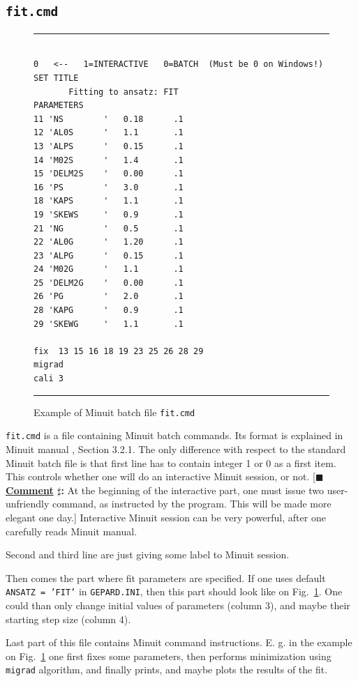 \documentclass[12pt]{article}
\newcounter{comment}
\newcommand{\comminline}[1]{{%
\refstepcounter{comment}%
\ttfamily\small[$\blacksquare$ \textbf{\underline{Comment}
$\sharp$\thecomment:} #1]}}
\begin{document}
\subsection{\texttt{fit.cmd}}

\begin{figure}[t]
\begin{center}
\hrule
\begin{verbatim}

0   <--   1=INTERACTIVE   0=BATCH  (Must be 0 on Windows!)
SET TITLE
       Fitting to ansatz: FIT
PARAMETERS
11 'NS        '   0.18      .1  
12 'AL0S      '   1.1       .1   
13 'ALPS      '   0.15      .1  
14 'M02S      '   1.4       .1
15 'DELM2S    '   0.00      .1  
16 'PS        '   3.0       .1  
18 'KAPS      '   1.1       .1  
19 'SKEWS     '   0.9       .1  
21 'NG        '   0.5       .1  
22 'AL0G      '   1.20      .1   
23 'ALPG      '   0.15      .1  
24 'M02G      '   1.1       .1
25 'DELM2G    '   0.00      .1  
26 'PG        '   2.0       .1  
28 'KAPG      '   0.9       .1  
29 'SKEWG     '   1.1       .1  

fix  13 15 16 18 19 23 25 26 28 29
migrad
cali 3

\end{verbatim}
\hrule
\end{center}
\caption{Example of Minuit batch file \texttt{fit.cmd}}
\label{fig:fit.cmd}
\end{figure}

\texttt{fit.cmd} is a file containing Minuit batch commands. Its format is explained in
Minuit manual \cite{Minuit}, Section 3.2.1. The only difference with respect to the
standard Minuit batch file is that first line has to contain integer 1 or 0 as a first
item. This controls whether one will do an interactive Minuit session, or not.
\comminline{At the beginning of the interactive part, one must issue two user-unfriendly
command, as instructed by the program. This will be made more elegant one day.}
Interactive Minuit session can be very powerful, after one carefully reads Minuit manual.

Second and third line are just giving some label to Minuit session.

Then comes the part where fit parameters are specified.
If one uses default \texttt{ANSATZ = 'FIT'} in
\texttt{GEPARD.INI}, then this part should look like on
Fig.~\ref{fig:fit.cmd}. One could than only change initial values of parameters
(column 3), and maybe their starting step size (column 4).

Last part of this file contains Minuit command instructions. E. g. in the
example on Fig.~\ref{fig:fit.cmd} one first fixes some parameters,
then performs minimization using \texttt{migrad} algorithm,
and finally prints, and maybe plots the results of the fit.
\end{document}
